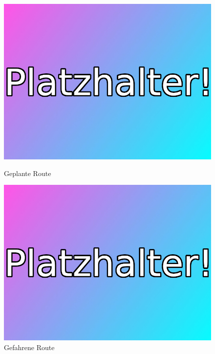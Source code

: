 \begin{figure}[ht]
    \begin{minipage}{0.48\textwidth}
        \centering
        \includegraphics[width=.9\linewidth]{Bilder/platzhalter.jpeg}
        \caption[fig:planned_route]{Geplante Route}
    \end{minipage}
    \begin{minipage}{0.48\textwidth}
        \centering
        \includegraphics[width=.9\linewidth]{Bilder/platzhalter.jpeg}
        \caption[fig:actual_route]{Gefahrene Route}
    \end{minipage}
\end{figure}